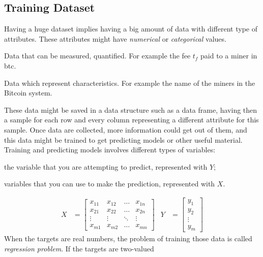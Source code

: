 \documentclass[USenglish]{uit-thesis}
\begin{document}
\subsection{Training Dataset}
\label{sec:trainingdataset}
Having a huge dataset implies having a big amount
of data with different type of attributes. These attributes might have
\emph{numerical} or \emph{categorical} values. 
\begin{description}[leftmargin=!, labelwidth=\widthof{\bfseries -Categorical- }, noitemsep]
	\item [Numerical:] Data that can be measured, quantified. For example
	the fee $t_f$ paid to a miner in \gls{btc}.
	\item [Categorical:]Data which represent characteristics. For
	example the name of the miners in the Bitcoin system.
\end{description}
These data might be saved in a data structure such as a data frame,
having then a sample for each row and every column representing
a different attribute for this sample.
Once data are collected, more information could get out
of them, and this data might be trained to get predicting
models or other useful material.
Training and predicting models involves different types of variables:
\begin{description}[leftmargin=!, labelwidth=\widthof{\bfseries -Target variables- }, noitemsep]
	\item[Target variables:] the variable that you are attempting to predict, represented with $Y$;
	\item[Predictors:] variables that you can use to make the prediction, represented with $X$.
\end{description}
\begin{align}
X &=\begin{bmatrix}
x_{11} & x_{12}  & \dots & x_{1n}\\
x_{21} & x_{22} & \dots & x_{2n}\\
\vdots & \vdots & \ddots& \vdots\\
x_{m1} & x_{m2} & \dots & x_{mn}
\end{bmatrix} &
Y &=\begin{bmatrix}
y_{1}\\
y_{2}\\
\vdots\\
y_{m}
\end{bmatrix} 
\end{align}
When the targets are real numbers,
the problem of training those data is called
\emph{regression problem}. If the targets are two-valued
\end{document}
